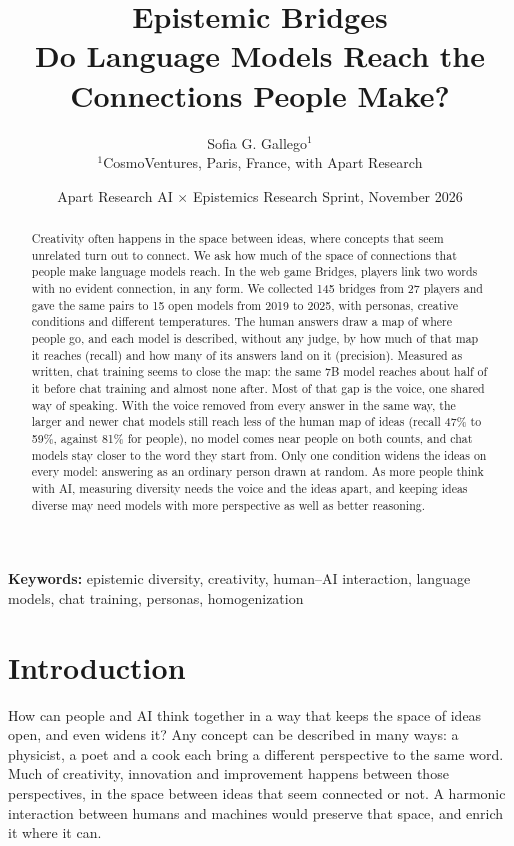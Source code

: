 \documentclass[11pt]{article}
\title{\textbf{Epistemic Bridges}\\
\large Do Language Models Reach the Connections People Make?}
\author{
Sofia G. Gallego$^{1}$ \\[4pt]
\normalsize $^1$CosmoVentures, Paris, France, with Apart Research
}
\date{Apart Research AI $\times$ Epistemics Research Sprint, November 2026}
\begin{document}
\maketitle

\begin{abstract}
Creativity often happens in the space between ideas, where concepts that seem unrelated turn out to connect. We ask how much of the space of connections that people make language models reach. In the web game Bridges, players link two words with no evident connection, in any form. We collected 145 bridges from 27 players and gave the same pairs to 15 open models from 2019 to 2025, with personas, creative conditions and different temperatures. The human answers draw a map of where people go, and each model is described, without any judge, by how much of that map it reaches (recall) and how many of its answers land on it (precision). Measured as written, chat training seems to close the map: the same 7B model reaches about half of it before chat training and almost none after. Most of that gap is the voice, one shared way of speaking. With the voice removed from every answer in the same way, the larger and newer chat models still reach less of the human map of ideas (recall 47\% to 59\%, against 81\% for people), no model comes near people on both counts, and chat models stay closer to the word they start from. Only one condition widens the ideas on every model: answering as an ordinary person drawn at random. As more people think with AI, measuring diversity needs the voice and the ideas apart, and keeping ideas diverse may need models with more perspective as well as better reasoning.
\end{abstract}

\noindent\textbf{Keywords:} epistemic diversity, creativity, human--AI interaction, language models, chat training, personas, homogenization

\section{Introduction}

How can people and AI think together in a way that keeps the space of ideas open, and even widens it? Any concept can be described in many ways: a physicist, a poet and a cook each bring a different perspective to the same word. Much of creativity, innovation and improvement happens between those perspectives, in the space between ideas that seem connected or not. A harmonic interaction between humans and machines would preserve that space, and enrich it where it can.
\end{document}
